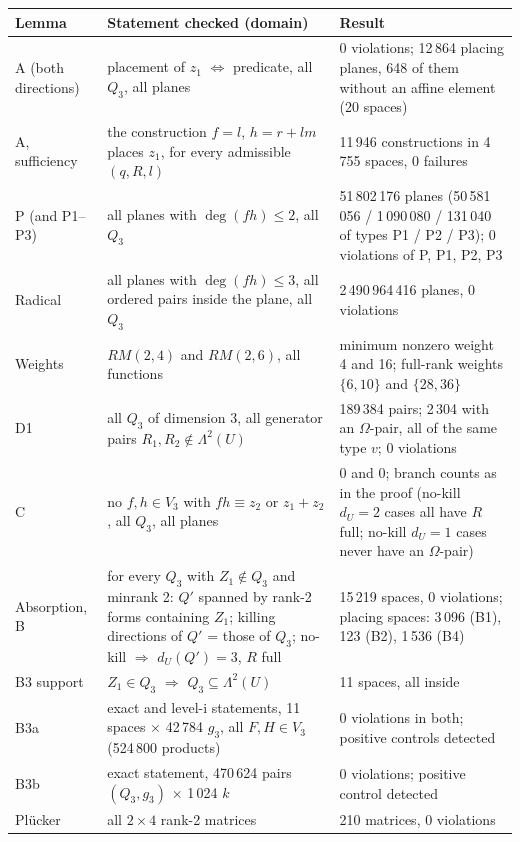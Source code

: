 \documentclass[11pt,a4paper]{article}
\theoremstyle{plain}
\theoremstyle{definition}
\theoremstyle{remark}
\newcommand{\Lam}{\Lambda^{2}}
\newcommand{\dU}{d_U}
\begin{document}
\begin{center}
\small
\begin{tabularx}{\textwidth}{@{}l X X@{}}
\toprule
Lemma & Statement checked (domain) & Result \\
\midrule
A (both directions) & placement of $z_1$ $\Leftrightarrow$ predicate, all $Q_3$, all planes & 0 violations; 12\,864 placing planes, 648 of them without an affine element (20 spaces) \\
A, sufficiency & the construction $f=l$, $h=r+lm$ places $z_1$, for every admissible $(q,R,l)$ & 11\,946 constructions in 4\,755 spaces, 0 failures \\
P (and P1--P3) & all planes with $\deg(fh)\le2$, all $Q_3$ & 51\,802\,176 planes (50\,581\,056 / 1\,090\,080 / 131\,040 of types P1 / P2 / P3); 0 violations of P, P1, P2, P3 \\
Radical & all planes with $\deg(fh)\le3$, all ordered pairs inside the plane, all $Q_3$ & 2\,490\,964\,416 planes, 0 violations \\
Weights & $RM(2,4)$ and $RM(2,6)$, all functions & minimum nonzero weight 4 and 16; full-rank weights $\{6,10\}$ and $\{28,36\}$ \\
D1 & all $Q_3$ of dimension 3, all generator pairs $R_1,R_2\notin\Lam(U)$ & 189\,384 pairs; 2\,304 with an $\Omega$-pair, all of the same type $v$; 0 violations \\
C & no $f,h\in V_3$ with $fh\equiv z_2$ or $z_1+z_2$, all $Q_3$, all planes & 0 and 0; branch counts as in the proof (no-kill $\dU=2$ cases all have $R$ full; no-kill $\dU=1$ cases never have an $\Omega$-pair) \\
Absorption, B & for every $Q_3$ with $Z_1\notin Q_3$ and minrank 2: $Q'$ spanned by rank-2 forms containing $Z_1$; killing directions of $Q'$ = those of $Q_3$; no-kill $\Rightarrow$ $\dU(Q')=3$, $R$ full & 15\,219 spaces, 0 violations; placing spaces: 3\,096 (B1), 123 (B2), 1\,536 (B4) \\
B3 support & $Z_1\in Q_3$ $\Rightarrow$ $Q_3\subseteq\Lam(U)$ & 11 spaces, all inside \\
B3a & exact and level-i statements, 11 spaces $\times$ 42\,784 $g_3$, all $F,H\in V_3$ (524\,800 products) & 0 violations in both; positive controls detected \\
B3b & exact statement, 470\,624 pairs $(Q_3,g_3)$ $\times$ 1\,024 $k$ & 0 violations; positive control detected \\
Pl\"ucker & all $2\times4$ rank-2 matrices & 210 matrices, 0 violations \\
\bottomrule
\end{tabularx}
\end{center}
\end{document}
